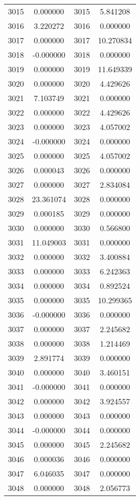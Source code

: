 \documentclass[12pt]{article}
\begin{document}
\begin{longtable}{@{}cccc@{}}
3015 & 0.000000 & 3015 & 5.841208 \\
3016 & 3.220272 & 3016 & 0.000000 \\
3017 & 0.000000 & 3017 & 10.270834 \\
3018 & -0.000000 & 3018 & 0.000000 \\
3019 & 0.000000 & 3019 & 11.649339 \\
3020 & 0.000000 & 3020 & 4.429626 \\
3021 & 7.103749 & 3021 & 0.000000 \\
3022 & 0.000000 & 3022 & 4.429626 \\
3023 & 0.000000 & 3023 & 4.057002 \\
3024 & -0.000000 & 3024 & 0.000000 \\
3025 & 0.000000 & 3025 & 4.057002 \\
3026 & 0.000043 & 3026 & 0.000000 \\
3027 & 0.000000 & 3027 & 2.834084 \\
3028 & 23.361074 & 3028 & 0.000000 \\
3029 & 0.000185 & 3029 & 0.000000 \\
3030 & 0.000000 & 3030 & 0.566800 \\
3031 & 11.049003 & 3031 & 0.000000 \\
3032 & 0.000000 & 3032 & 3.400884 \\
3033 & 0.000000 & 3033 & 6.242363 \\
3034 & 0.000000 & 3034 & 0.892524 \\
3035 & 0.000000 & 3035 & 10.299365 \\
3036 & -0.000000 & 3036 & 0.000000 \\
3037 & 0.000000 & 3037 & 2.245682 \\
3038 & 0.000000 & 3038 & 1.214469 \\
3039 & 2.891774 & 3039 & 0.000000 \\
3040 & 0.000000 & 3040 & 3.460151 \\
3041 & -0.000000 & 3041 & 0.000000 \\
3042 & 0.000000 & 3042 & 3.924557 \\
3043 & 0.000000 & 3043 & 0.000000 \\
3044 & -0.000000 & 3044 & 0.000000 \\
3045 & 0.000000 & 3045 & 2.245682 \\
3046 & 0.000036 & 3046 & 0.000000 \\
3047 & 6.046035 & 3047 & 0.000000 \\
3048 & 0.000000 & 3048 & 2.056773 \\

\end{longtable}
\end{document}
